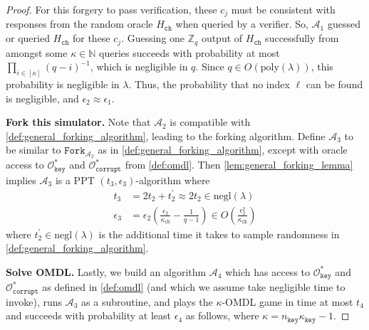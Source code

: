\documentclass[11pt]{article}
\theoremstyle{definition}
\newcommand{\N}{\bbn}
\newcommand{\lt}{\texttt{lt}}
\newcommand{\tlt}{\texttt{tlt}}
\newcommand{\ring}{\texttt{ring}}
\newcommand{\dst}{\texttt{dst}}
\newcommand{\Zq}{\mathbb{Z}_q}
\newcommand{\bbn}{\mathbb{N}}
\newcommand{\secpar}{\lambda}
\newcommand{\msg}{\texttt{msg}}
\newcommand{\polysecpar}{O(\text{poly}(\secpar))}
\newcommand{\negl}{\text{negl}(\secpar)}
\newcommand{\corruptionOracle}{\mathcal{O}_{\texttt{corrupt}}}
\newcommand{\keyOracle}{\mathcal{O}_{\texttt{key}}}
\newcommand{\signaturequery}{(\texttt{dst}_{j} \mid \mid \ring \mid \mid \tlt \mid \mid \underline{\widehat{Y}} \mid \mid \mathfrak{W} \mid \mid \underline{W} \mid \mid \underline{\mu} \mid \mid L_{j} \mid \mid R_{j} \mid \mid \msg)}
\begin{document}
\begin{proof}
For this forgery to pass verification, these $c_j$ must be consistent with responses from the random oracle $H_{\texttt{ch}}$ when queried by a verifier. So, $\mathcal{A}_1$ guessed or queried $H_{\texttt{ch}}$ for these $c_j$.
Guessing one $\Zq$ output of $H_{\texttt{ch}}$ successfully from amongst some $\kappa \in \N$ queries succeeds with probability at most $\prod_{i \in [\kappa]} (q-i)^{-1}$, which is negligible in $q$.  Since $q \in \polysecpar$, this probability is negligible in $\secpar$. Thus, the probability that no index $\ell$ can be found is negligible, and $\epsilon_2 \approx \epsilon_1$. 






\textbf{Fork this simulator.} 
Note that $\mathcal{A}_2$ is compatible with \cref{def:general_forking_algorithm}, leading to the forking algorithm.
Define $\mathcal{A}_3$ to be similar to $\texttt{Fork}_{\mathcal{A}_2}$ as in 
\cref{def:general_forking_algorithm}, except with oracle access to $\keyOracle^*$ and $\corruptionOracle^*$ from \cref{def:omdl}. Then \cref{lem:general_forking_lemma} implies $\mathcal{A}_3$ is a PPT $(t_3, \epsilon_3)$-algorithm where
\begin{align*}
t_3  &= 2t_2+t_2^\prime \approx 2t_2 \in \negl \\
 \epsilon_3 &= \epsilon_2\left(\frac{\epsilon_2}{\kappa_{\texttt{ch}}} - \frac{1}{q-1}\right) \in O\left(\frac{\epsilon_2^2}{\kappa_{\texttt{ch}}}\right)
\end{align*} where $t_2^\prime \in \negl$ is the additional time it takes to sample randomness in \cref{def:general_forking_algorithm}. 

\textbf{Solve OMDL.} Lastly, we build an algorithm $\mathcal{A}_4$ which has access to $\keyOracle^*$ and $\corruptionOracle^*$ as defined in \cref{def:omdl} (and which we assume take negligible time to invoke), runs $\mathcal{A}_3$ as a subroutine, and plays the $\kappa$-OMDL game in time at most $t_4$ and succeeds with probability at least $\epsilon_4$ as follows, where $\kappa =n_{\texttt{key}}\kappa_{\texttt{key}} - 1$.


\end{proof}
\end{document}
